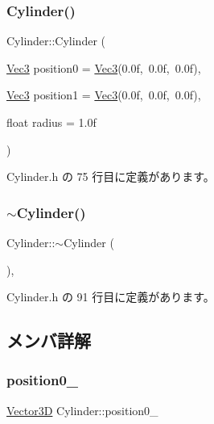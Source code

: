 \subsubsection{\texorpdfstring{Cylinder()}{Cylinder()}}
{\footnotesize\ttfamily Cylinder\+::\+Cylinder (\begin{DoxyParamCaption}\item[{\mbox{\hyperlink{_vector3_d_8h_ab16f59e4393f29a01ec8b9bbbabbe65d}{Vec3}}}]{position0 = {\ttfamily \mbox{\hyperlink{_vector3_d_8h_ab16f59e4393f29a01ec8b9bbbabbe65d}{Vec3}}(0.0f,~0.0f,~0.0f)},  }\item[{\mbox{\hyperlink{_vector3_d_8h_ab16f59e4393f29a01ec8b9bbbabbe65d}{Vec3}}}]{position1 = {\ttfamily \mbox{\hyperlink{_vector3_d_8h_ab16f59e4393f29a01ec8b9bbbabbe65d}{Vec3}}(0.0f,~0.0f,~0.0f)},  }\item[{float}]{radius = {\ttfamily 1.0f} }\end{DoxyParamCaption})\hspace{0.3cm}{\ttfamily [inline]}}



 Cylinder.\+h の 75 行目に定義があります。

\mbox{\label{class_cylinder_a05ab556f0ae3cd6e99d9d1f3caca80b3}} 
\subsubsection{\texorpdfstring{$\sim$\+Cylinder()}{~Cylinder()}}
{\footnotesize\ttfamily Cylinder\+::$\sim$\+Cylinder (\begin{DoxyParamCaption}{ }\end{DoxyParamCaption})\hspace{0.3cm}{\ttfamily [inline]}, {\ttfamily [virtual]}}



 Cylinder.\+h の 91 行目に定義があります。



\subsection{メンバ詳解}
\mbox{\label{class_cylinder_ade5211259c6543ae77c4707b1ec26538}} 
\subsubsection{\texorpdfstring{position0\+\_\+}{position0\_}}
{\footnotesize\ttfamily \mbox{\hyperlink{class_vector3_d}{Vector3D}} Cylinder\+::position0\+\_\+}



